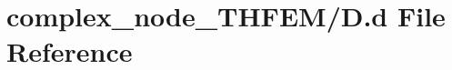 \hypertarget{complex__node___t_h_f_e_m_2_d_8d}{}\section{complex\+\_\+node\+\_\+\+T\+H\+F\+E\+M/D.d File Reference}
\label{complex__node___t_h_f_e_m_2_d_8d}
